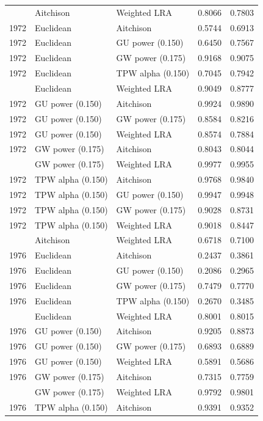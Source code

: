 \begin{longtable}[t]{rllrr}
\addlinespace
1972 & Aitchison & Weighted LRA & 0.8066 & 0.7803\\
1972 & Euclidean & Aitchison & 0.5744 & 0.6913\\
1972 & Euclidean & GU power (0.150) & 0.6450 & 0.7567\\
1972 & Euclidean & GW power (0.175) & 0.9168 & 0.9075\\
1972 & Euclidean & TPW alpha (0.150) & 0.7045 & 0.7942\\
\addlinespace
1972 & Euclidean & Weighted LRA & 0.9049 & 0.8777\\
1972 & GU power (0.150) & Aitchison & 0.9924 & 0.9890\\
1972 & GU power (0.150) & GW power (0.175) & 0.8584 & 0.8216\\
1972 & GU power (0.150) & Weighted LRA & 0.8574 & 0.7884\\
1972 & GW power (0.175) & Aitchison & 0.8043 & 0.8044\\
\addlinespace
1972 & GW power (0.175) & Weighted LRA & 0.9977 & 0.9955\\
1972 & TPW alpha (0.150) & Aitchison & 0.9768 & 0.9840\\
1972 & TPW alpha (0.150) & GU power (0.150) & 0.9947 & 0.9948\\
1972 & TPW alpha (0.150) & GW power (0.175) & 0.9028 & 0.8731\\
1972 & TPW alpha (0.150) & Weighted LRA & 0.9018 & 0.8447\\
\addlinespace
1976 & Aitchison & Weighted LRA & 0.6718 & 0.7100\\
1976 & Euclidean & Aitchison & 0.2437 & 0.3861\\
1976 & Euclidean & GU power (0.150) & 0.2086 & 0.2965\\
1976 & Euclidean & GW power (0.175) & 0.7479 & 0.7770\\
1976 & Euclidean & TPW alpha (0.150) & 0.2670 & 0.3485\\
\addlinespace
1976 & Euclidean & Weighted LRA & 0.8001 & 0.8015\\
1976 & GU power (0.150) & Aitchison & 0.9205 & 0.8873\\
1976 & GU power (0.150) & GW power (0.175) & 0.6893 & 0.6889\\
1976 & GU power (0.150) & Weighted LRA & 0.5891 & 0.5686\\
1976 & GW power (0.175) & Aitchison & 0.7315 & 0.7759\\
\addlinespace
1976 & GW power (0.175) & Weighted LRA & 0.9792 & 0.9801\\
1976 & TPW alpha (0.150) & Aitchison & 0.9391 & 0.9352\\

\end{longtable}

